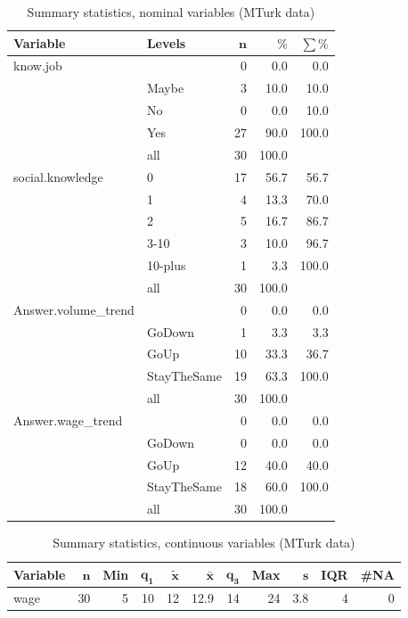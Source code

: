 \documentclass[a4paper,10pt]{article}\usepackage[]{graphicx}\usepackage[]{color}
\begin{document}
\begin{table}[ht]
\centering
{\footnotesize
\begin{tabular}{ll|rrr}
 \textbf{Variable} & \textbf{Levels} & $\mathbf{n}$ & $\mathbf{\%}$ & $\mathbf{\sum \%}$ \\ 
  \hline
know.job &  & 0 & 0.0 & 0.0 \\ 
   & Maybe & 3 & 10.0 & 10.0 \\ 
   & No & 0 & 0.0 & 10.0 \\ 
   & Yes & 27 & 90.0 & 100.0 \\ 
   \hline
 & all & 30 & 100.0 &  \\ 
   \hline
\hline
social.knowledge & 0 & 17 & 56.7 & 56.7 \\ 
   & 1 & 4 & 13.3 & 70.0 \\ 
   & 2 & 5 & 16.7 & 86.7 \\ 
   & 3-10 & 3 & 10.0 & 96.7 \\ 
   & 10-plus & 1 & 3.3 & 100.0 \\ 
   \hline
 & all & 30 & 100.0 &  \\ 
   \hline
\hline
Answer.volume\_trend &  & 0 & 0.0 & 0.0 \\ 
   & GoDown & 1 & 3.3 & 3.3 \\ 
   & GoUp & 10 & 33.3 & 36.7 \\ 
   & StayTheSame & 19 & 63.3 & 100.0 \\ 
   \hline
 & all & 30 & 100.0 &  \\ 
   \hline
\hline
Answer.wage\_trend &  & 0 & 0.0 & 0.0 \\ 
   & GoDown & 0 & 0.0 & 0.0 \\ 
   & GoUp & 12 & 40.0 & 40.0 \\ 
   & StayTheSame & 18 & 60.0 & 100.0 \\ 
   \hline
 & all & 30 & 100.0 &  \\ 
   \hline
\hline
\end{tabular}
}
\caption{Summary statistics, nominal variables (MTurk data)} 
\label{tab1:35-1010}
\end{table}
\begin{table}[ht]
\centering
{\footnotesize
\begin{tabular}{lrrrrrrrrrr}
 \textbf{Variable} & $\mathbf{n}$ & \textbf{Min} & $\mathbf{q_1}$ & $\mathbf{\widetilde{x}}$ & $\mathbf{\bar{x}}$ & $\mathbf{q_3}$ & \textbf{Max} & $\mathbf{s}$ & \textbf{IQR} & \textbf{\#NA} \\ 
  \hline
wage & 30 & 5 & 10 & 12 & 12.9 & 14 & 24 & 3.8 & 4 & 0 \\ 
  \end{tabular}
}
\caption{Summary statistics, continuous variables (MTurk data)} 
\label{tab2:35-1010}
\end{table}
\end{document}
